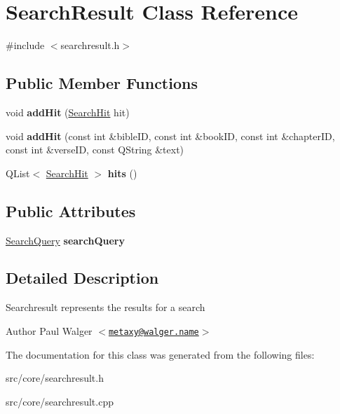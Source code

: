 \hypertarget{classSearchResult}{
\section{SearchResult Class Reference}
\label{classSearchResult}
}


{\ttfamily \#include $<$searchresult.h$>$}\subsection*{Public Member Functions}
\begin{DoxyCompactItemize}
\item 
\hypertarget{classSearchResult_a667865865cfa6841417137acf6cb9409}{
void {\bfseries addHit} (\hyperlink{classSearchHit}{SearchHit} hit)}
\label{classSearchResult_a667865865cfa6841417137acf6cb9409}

\item 
\hypertarget{classSearchResult_aedc8e1bfb130801533466a0626919742}{
void {\bfseries addHit} (const int \&bibleID, const int \&bookID, const int \&chapterID, const int \&verseID, const QString \&text)}
\label{classSearchResult_aedc8e1bfb130801533466a0626919742}

\item 
\hypertarget{classSearchResult_a64c07b8339ad97bd92fddc130db18786}{
QList$<$ \hyperlink{classSearchHit}{SearchHit} $>$ {\bfseries hits} ()}
\label{classSearchResult_a64c07b8339ad97bd92fddc130db18786}

\end{DoxyCompactItemize}
\subsection*{Public Attributes}
\begin{DoxyCompactItemize}
\item 
\hypertarget{classSearchResult_af9cfb561f67a5d32fd713680e34ca72a}{
\hyperlink{classSearchQuery}{SearchQuery} {\bfseries searchQuery}}
\label{classSearchResult_af9cfb561f67a5d32fd713680e34ca72a}

\end{DoxyCompactItemize}


\subsection{Detailed Description}
Searchresult represents the results for a search

\begin{DoxyAuthor}{Author}
Paul Walger $<$\href{mailto:metaxy@walger.name}{\tt metaxy@walger.name}$>$ 
\end{DoxyAuthor}


The documentation for this class was generated from the following files:\begin{DoxyCompactItemize}
\item 
src/core/searchresult.h\item 
src/core/searchresult.cpp\end{DoxyCompactItemize}
